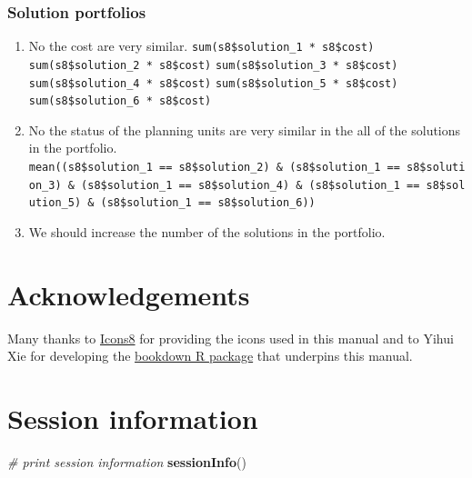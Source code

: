 \documentclass[12pt,]{book}
\newenvironment{Shaded}{\begin{snugshade}}{\end{snugshade}}
\newcommand{\KeywordTok}[1]{\textcolor[rgb]{0.13,0.29,0.53}{\textbf{#1}}}
\newcommand{\CommentTok}[1]{\textcolor[rgb]{0.56,0.35,0.01}{\textit{#1}}}
\newcommand{\NormalTok}[1]{#1}
\providecommand{\tightlist}{%
  \setlength{\itemsep}{0pt}\setlength{\parskip}{0pt}}
\let\BeginKnitrBlock\begin \let\EndKnitrBlock\end
\begin{document}
\subsection{Solution portfolios}\label{solution-portfolios-1}

\BeginKnitrBlock{rmdanswer}
\begin{enumerate}
\def\labelenumi{\arabic{enumi}.}
\tightlist
\item
  No the cost are very similar. \newline
   \texttt{sum(s8\$solution\_1\ *\ s8\$cost)} \newline
   \texttt{sum(s8\$solution\_2\ *\ s8\$cost)} \newline
   \texttt{sum(s8\$solution\_3\ *\ s8\$cost)} \newline
   \texttt{sum(s8\$solution\_4\ *\ s8\$cost)} \newline
   \texttt{sum(s8\$solution\_5\ *\ s8\$cost)} \newline
   \texttt{sum(s8\$solution\_6\ *\ s8\$cost)}
\item
  No the status of the planning units are very similar in the all of the
  solutions in the portfolio. \newline
  \texttt{mean((s8\$solution\_1\ ==\ s8\$solution\_2)\ \&\ (s8\$solution\_1\ ==\ s8\$solution\_3)\ \&\ (s8\$solution\_1\ ==\ s8\$solution\_4)\ \&\ (s8\$solution\_1\ ==\ s8\$solution\_5)\ \&\ (s8\$solution\_1\ ==\ s8\$solution\_6))}
\item
  We should increase the number of the solutions in the portfolio.
\end{enumerate}
\EndKnitrBlock{rmdanswer}

\chapter{Acknowledgements}\label{acknowledgements}

Many thanks to \href{https://icons8.com}{Icons8} for providing the icons
used in this manual and to Yihui Xie for developing the
\href{http://bookdown.org}{bookdown R package} that underpins this
manual.

\chapter{Session information}\label{session-information}

\begin{Shaded}
\begin{Highlighting}[]
\CommentTok{# print session information}
\KeywordTok{sessionInfo}\NormalTok{()}
\end{Highlighting}
\end{Shaded}
\end{document}
